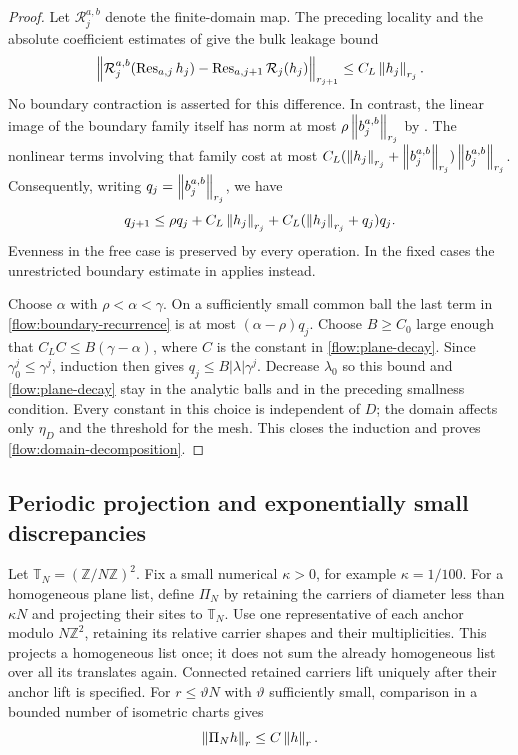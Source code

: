 \begin{proof}
Let $\mathcal R_j^{a,b}$ denote the finite-domain map.  The preceding
locality and the absolute coefficient estimates of 
give the bulk leakage bound
\begin{equation}\label{flow:boundary-leakage}
 \left\|\mathcal R_j^{a,b}(\operatorname{Res}_{a,j}h_j)
       -\operatorname{Res}_{a,j+1}\mathcal R_j(h_j)\right\|_{r_{j+1}}
                           \le C_L\left\|h_j\right\|_{r_j}.
\end{equation}
No boundary contraction is asserted for this difference.  In contrast,
the linear image of the boundary family itself has norm at most
$\rho\left\|b_j^{a,b}\right\|_{r_j}$ by .  The nonlinear
terms involving that family cost at most
$C_L(\left\|h_j\right\|_{r_j}+\left\|b_j^{a,b}\right\|_{r_j})
\left\|b_j^{a,b}\right\|_{r_j}$.  Consequently, writing
$q_j=\left\|b_j^{a,b}\right\|_{r_j}$, we have
\begin{equation}\label{flow:boundary-recurrence}
 q_{j+1}\le\rho q_j+C_L\left\|h_j\right\|_{r_j}
                     +C_L(\left\|h_j\right\|_{r_j}+q_j)q_j.
\end{equation}
Evenness in the free case is preserved by every operation.  In the
fixed cases the unrestricted boundary estimate in 
applies instead.

Choose $\alpha$ with $\rho<\alpha<\gamma$.  On a sufficiently small
common ball the last term in \eqref{flow:boundary-recurrence} is at
most $(\alpha-\rho)q_j$.  Choose $B\ge C_0$ large enough that
$C_LC\le B(\gamma-\alpha)$, where $C$ is the constant in
\eqref{flow:plane-decay}.  Since $\gamma_0^j\le\gamma^j$, induction
then gives $q_j\le B|\lambda|\gamma^j$.  Decrease $\lambda_0$ so
this bound and \eqref{flow:plane-decay} stay in the analytic balls
and in the preceding smallness condition.  Every constant in this
choice is independent of $D$; the domain affects only $\eta_D$ and
the threshold for the mesh.  This closes the induction and proves
\eqref{flow:domain-decomposition}.
\end{proof}

\subsection{Periodic projection and exponentially small discrepancies}

Let $\mathbb T_N=(\mathbb Z/N\mathbb Z)^2$.  Fix a small numerical
$\kappa>0$, for example $\kappa=1/100$.  For a homogeneous plane
list, define $\Pi_N$ by retaining the carriers of diameter less than
$\kappa N$ and projecting their sites to $\mathbb T_N$.  Use one
representative of each anchor modulo $N\mathbb Z^2$, retaining its
relative carrier shapes and their multiplicities.  This projects a
homogeneous list once; it does not sum the already homogeneous list
over all its translates again.  Connected retained carriers lift
uniquely after their anchor lift is specified.  For $r\le\vartheta N$
with $\vartheta$ sufficiently small, comparison in a bounded number
of isometric charts gives
\begin{equation}\label{flow:projection-norm}
                       \left\|\Pi_N h\right\|_r\le C\left\|h\right\|_r.
\end{equation}

